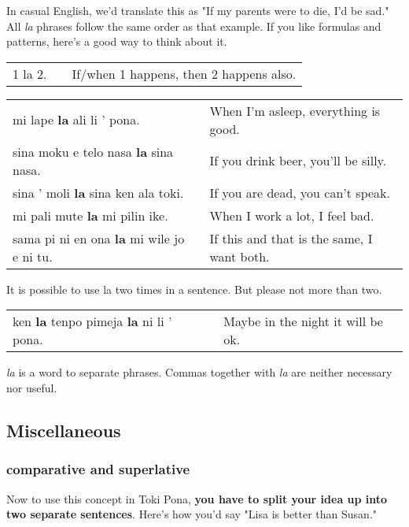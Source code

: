 In casual English, we'd translate this as "If my parents were to die, I'd be sad." 
All \textit{la} phrases follow the same order as that example. 
If you like formulas and patterns, here's a good way to think about it. 

\begin{supertabular}{p{5,5cm}|ll}
1 la 2. && If/when 1 happens, then 2 happens also. \\  %
\end{supertabular} 

\begin{supertabular}{p{5,5cm}|ll}
mi lape \textbf{la} ali li ' pona. && When I'm asleep, everything is good. \\
sina moku e telo nasa \textbf{la} sina nasa. && If you drink beer, you'll be silly. \\
sina ' moli \textbf{la} sina ken ala toki. && If you are dead, you can't speak. \\
mi pali mute \textbf{la} mi pilin ike. && When I work a lot, I feel bad. \\
sama pi ni en ona \textbf{la} mi wile jo e ni tu. &&  If this and that is the same, I want both.\\
\end{supertabular} 

It is possible to use la two times in a sentence. But please not more than two. 

\begin{supertabular}{p{5,5cm}|ll}
ken \textbf{la} tenpo pimeja \textbf{la} ni li ' pona. && Maybe in the night it will be ok. \\  
\end{supertabular} 

\textit{la} is a word to separate phrases. Commas together with \textit{la} are neither necessary nor useful. 
%
\subsection*{Miscellaneous}
\subsubsection*{comparative and superlative} 
%
Now to use this concept in Toki Pona, \textbf{you have to split your idea up into two separate sentences}. 
Here's how you'd say "Lisa is better than Susan."

